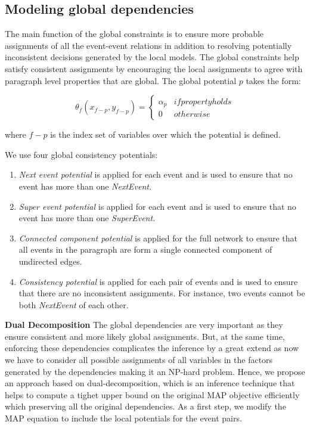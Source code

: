 \subsection{Modeling global dependencies}
The main function of the global constraints is to ensure more probable assignments of all the event-event relations in addition to resolving potentially inconsistent decisions generated by the local models. The global constraints help satisfy consistent assignments by encouraging the local assignments to agree with paragraph level properties that are global. The global potential $p$ takes the form:

\begin{equation}
\theta_f(x_{f-p}, y_{f-p}) = 
\left\{\begin{matrix}
\alpha_p & if property holds\\ 
0 & otherwise
\end{matrix}\right.
\end{equation}

where $f-p$ is the index set of variables over which the potential is defined.

We use four global consistency potentials:

\begin{enumerate}
\item {\em Next event potential} is applied for each event and is used to ensure that no event has more than one {\em NextEvent.}
\item {\em Super event potential} is applied for each event and is used to ensure that no event has more than one {\em SuperEvent.}
\item {\em Connected component potential} is applied for the full network to ensure that all events in the paragraph are form a single connected component of undirected edges.
\item {\em Consistency potential} is applied for each pair of events and is used to ensure that there are no inconsistent assignments. For instance, two events cannot be both {\em NextEvent} of each other.
\end{enumerate}

{\bf Dual Decomposition} The global dependencies are very important as they ensure consistent and more likely global assignments. But, at the same time, enforcing these dependencies complicates the inference by a great extend as now we have to consider all possible assignments of all variables in the factors generated by the dependencies making it an NP-hard problem. Hence, we propose an approach based on dual-decomposition, which is an inference technique that helps to compute a tighet upper bound on the original MAP objective efficiently which preserving all the original dependencies. As a first step, we modify the MAP equation to include the local potentials for the event pairs.

